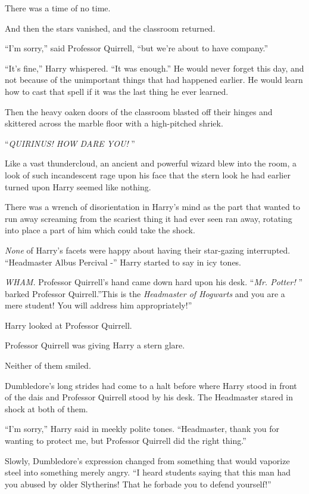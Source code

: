 There was a time of no time.

And then the stars vanished, and the classroom returned.

``I'm sorry,'' said Professor Quirrell, ``but we're about to have
company.''

``It's fine,'' Harry whispered. ``It was enough.'' He would never forget
this day, and not because of the unimportant things that had happened
earlier. He would learn how to cast that spell if it was the last thing
he ever learned.

Then the heavy oaken doors of the classroom blasted off their hinges and
skittered across the marble floor with a high-pitched shriek.

``\emph{QUIRINUS! HOW DARE YOU!} ''

Like a vast thundercloud, an ancient and powerful wizard blew into the
room, a look of such incandescent rage upon his face that the stern look
he had earlier turned upon Harry seemed like nothing.

There was a wrench of disorientation in Harry's mind as the part that
wanted to run away screaming from the scariest thing it had ever seen
ran away, rotating into place a part of him which could take the shock.

\emph{None} of Harry's facets were happy about having their star-gazing
interrupted. ``Headmaster Albus Percival -'' Harry started to say in icy
tones.

\emph{WHAM.} Professor Quirrell's hand came down hard upon his desk.
``\emph{Mr. Potter!} '' barked Professor Quirrell.''This is the
\emph{Headmaster of Hogwarts} and you are a mere student! You will
address him appropriately!''

Harry looked at Professor Quirrell.

Professor Quirrell was giving Harry a stern glare.

Neither of them smiled.

Dumbledore's long strides had come to a halt before where Harry stood in
front of the dais and Professor Quirrell stood by his desk. The
Headmaster stared in shock at both of them.

``I'm sorry,'' Harry said in meekly polite tones. ``Headmaster, thank
you for wanting to protect me, but Professor Quirrell did the right
thing.''

Slowly, Dumbledore's expression changed from something that would
vaporize steel into something merely angry. ``I heard students saying
that this man had you abused by older Slytherins! That he forbade you to
defend yourself!''

